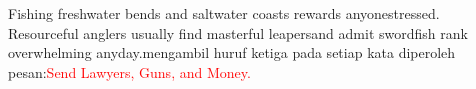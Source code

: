 \documentclass{article}
\begin{document}

Fishing freshwater bends and saltwater coasts rewards anyone\nfeeling stressed. Resourceful anglers usually find masterful leapers\nfun and admit swordfish rank overwhelming anyday.\n\nDengan mengambil huruf ketiga pada setiap kata diperoleh pesan\nberikut:\n\n\textcolor{red}{Send Lawyers, Guns, and Money.}
\end{document}
